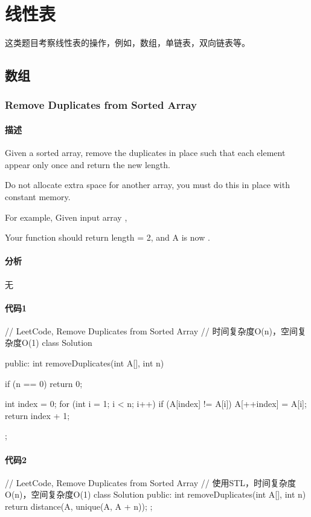 \chapter{线性表}
这类题目考察线性表的操作，例如，数组，单链表，双向链表等。


\section{数组} %


\subsection{Remove Duplicates from Sorted Array}
\label{sec:remove-duplicates-from-sorted-array}


\subsubsection{描述}
Given a sorted array, remove the duplicates in place such that each element appear only once and return the new length.

Do not allocate extra space for another array, you must do this in place with constant memory.

For example, Given input array ,

Your function should return length = 2, and A is now \code{[1,2]}.


\subsubsection{分析}
无


\subsubsection{代码1}
\begin{Code}
// LeetCode, Remove Duplicates from Sorted Array
// 时间复杂度O(n)，空间复杂度O(1)
class Solution {
public:
    int removeDuplicates(int A[], int n) {
        if (n == 0) return 0;

        int index = 0;
        for (int i = 1; i < n; i++) {
            if (A[index] != A[i])
                A[++index] = A[i];
        }
        return index + 1;
    }
};
\end{Code}


\subsubsection{代码2}
\begin{Code}
// LeetCode, Remove Duplicates from Sorted Array
// 使用STL，时间复杂度O(n)，空间复杂度O(1)
class Solution {
public:
    int removeDuplicates(int A[], int n) {
        return distance(A, unique(A, A + n));
    }
};
\end{Code}


